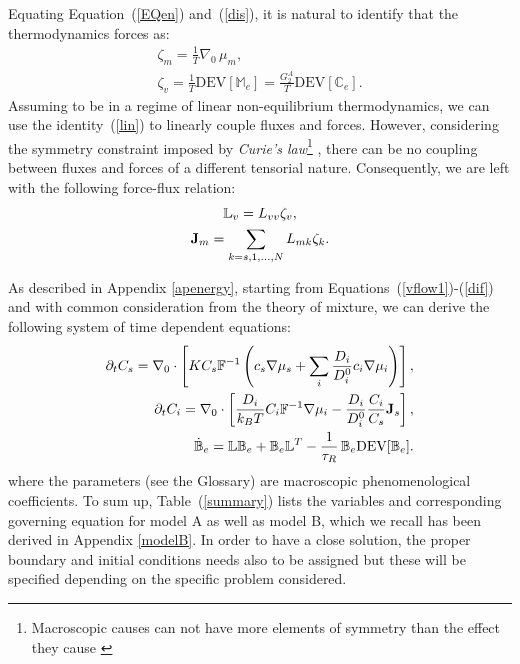 Equating Equation~(\ref{EQen}) and~(\ref{dis}), it is natural to identify that the thermodynamics forces as:
\begin{gather}
\zeta_m = \frac{1}{T} \nabla_0 \,\mu_m, \label{vflow1}\\
\zeta_v = \frac{1}{T} \text{DEV}[\mathbb{M}_e] = \frac{G^A_2}{T} \text{DEV}[\mathbb{C}_e].
\end{gather}
Assuming to be in a regime of linear non-equilibrium thermodynamics, we can use the identity~(\ref{lin}) to linearly couple fluxes and forces. However, considering the symmetry constraint imposed by \textit{Curie's law}\footnote{Macroscopic causes can not have more elements of symmetry than the effect they cause \cite{CIT}} , there can be no coupling between fluxes and forces of a different tensorial nature. Consequently, we are left with the following force-flux relation:
\begin{gather}
\mathbb{L}_v = L_{vv} \zeta_v,\label{vflow2}\\
\mathbf{J}_m = \sum_{k=s,1,\ldots,N} L_{mk} \zeta_k. \label{dif}
\end{gather}


As described in Appendix \ref{apenergy}, starting from Equations~(\ref{vflow1})-(\ref{dif}) and with common consideration from the theory of mixture, we can derive the following system of time dependent equations:
\begin{eqnarray}
\partial_t C_s=\nabla_0 \cdot\left[K C_s \mathbb{F}^{-1}\left(c_s\nabla \mu_s +\sum_i \frac{D_i}{D^0_i} c_i \nabla \mu_i\right)\right],\label{gov2}\\
\partial_t C_i= \nabla_0\cdot\left[\frac{D_i}{k_B T}C_i\mathbb{F}^{-1}\nabla \mu_i -\frac{D_i}{D^0_i} \frac{C_i}{C_s} \mathbf{J}_s\right],\label{gov3} \\
\dot{\mathbb{B}}_e =\mathbb{L}\mathbb{B}_e + \mathbb{B}_e \mathbb{L}^T - \frac{1}{\tau_R} \,\mathbb{B}_e\text{DEV}[\mathbb{B}_e].\label{Be}
\end{eqnarray}
where the parameters (see the Glossary) are macroscopic phenomenological coefficients. To sum up, Table~(\ref{summary}) lists the variables and corresponding governing equation for model A as well as model B, which we recall has been derived in Appendix \ref{modelB}. In order to have a close solution, the proper boundary and initial conditions needs also to be assigned but these will be specified depending on the specific problem considered.

